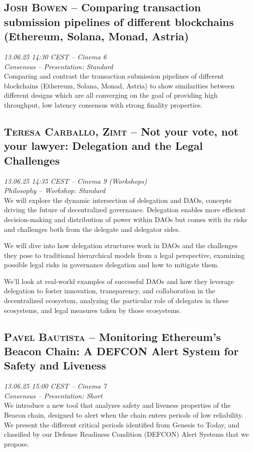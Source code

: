 \clearpage
\subsection {\textsc{Josh Bowen}  -- Comparing transaction submission pipelines of different blockchains (Ethereum, Solana, Monad, Astria)} \noindent \textit {13.06.25 14:30 CEST -- Cinema 6\\ Consensus -- Presentation: Standard}\\[1em] Comparing and contrast the transaction submission pipelines of different blockchains (Ethereum, Solana, Monad, Astria) to show similarities between different designs which are all converging on the goal of providing high throughput, low latency consensus with strong finality properties.

\clearpage
\subsection {\textsc{Teresa Carballo, Zimt}  -- Not your vote, not your lawyer: Delegation and the Legal Challenges} \noindent \textit {13.06.25 14:35 CEST -- Cinema 9 (Workshops)\\ Philosophy -- Workshop: Standard}\\[1em] We will explore the dynamic intersection of delegation and DAOs, concepts driving the future of decentralized governance. Delegation enables more efficient decision-making and distribution of power within DAOs but comes with its risks and challenges both from the delegate and delegator sides.

We will dive into how delegation structures work in DAOs and the challenges they pose to traditional hierarchical models from a legal perspective, examining possible legal risks in governance delegation and how to mitigate them.

We'll look at real-world examples of successful DAOs and how they leverage delegation to foster innovation, transparency, and collaboration in the decentralized ecosystem, analyzing the particular role of delegates in these ecosystems, and legal measures taken by those ecosystems.

\clearpage
\subsection {\textsc{Pavel Bautista}  -- Monitoring Ethereum’s Beacon Chain: A DEFCON Alert System for Safety and Liveness} \noindent \textit {13.06.25 15:00 CEST -- Cinema 7\\ Consensus -- Presentation: Short}\\[1em] We introduce a new tool that analyzes safety and liveness properties of the Beacon chain, designed to alert when the chain enters periods of low reliability. We present the different critical periods identified from Genesis to Today, and classified by our Defense Readiness Condition (DEFCON) Alert Systems that we propose.

